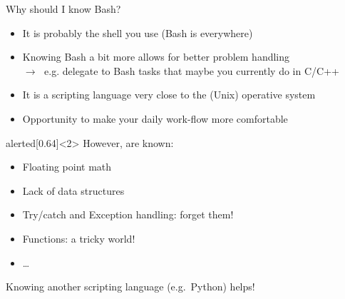 \begin{frame}{Why should I know Bash?}%
    \vspace{-3mm}
    \begin{itemize}
        \item It is probably the shell you use (Bash is everywhere)
        \item Knowing Bash a bit more allows for better problem handling \\
              $\to\;$ e.g. delegate to Bash tasks that maybe you currently do in C/C++
        \item It is a scripting language very close to the (Unix) operative system
        \item Opportunity to make your daily work-flow more comfortable
    \end{itemize}
    \begin{varblock}{alerted}[0.64\textwidth]{}<2>
        However,  are known:\hfill
        \begin{itemize}
            \item Floating point math
            \item Lack of data structures
            \item Try/catch and Exception handling: forget them!
            \item Functions: a tricky world!
            \item \ldots
        \end{itemize}
        Knowing another scripting language (e.g.\ Python) helps!
    \end{varblock}
\end{frame}
